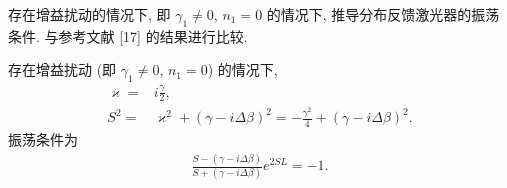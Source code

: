 \documentclass{note}
\begin{document}
\begin{exe}
    存在增益扰动的情况下, 即 $\gamma_1\neq 0$, $n_1=0$ 的情况下, 推导分布反馈激光器的振荡条件. 与参考文献 [17] 的结果进行比较.
\end{exe}
\begin{sol}
    存在增益扰动 (即 $\gamma_1\neq 0$, $n_1=0$) 的情况下,
    \begin{align}
        \varkappa=&i\frac{\gamma}{2},\\
        S^2=&\varkappa^2+(\gamma-i\Delta\beta)^2=-\frac{\gamma^2}{4}+(\gamma-i\Delta\beta)^2.
    \end{align}
    振荡条件为
    \begin{align}
        \frac{S-(\gamma-i\Delta\beta)}{S+(\gamma-i\Delta\beta)}e^{2SL}=-1.
    \end{align}
\end{sol}
\end{document}
